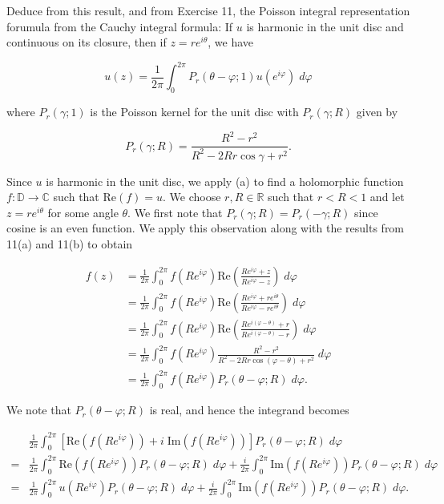 Deduce from this result, and from Exercise 11, the Poisson integral representation forumula from the Cauchy integral 
formula: If $u$ is harmonic in the unit disc and continuous on its closure, then if $z = re^{i \theta}$, we have

$$
u(z) = \frac{1}{2 \pi} \int_{0}^{2 \pi} P_r (\theta - \varphi; 1) u(e^{i \varphi}) \; d\varphi
$$

where $P_r(\gamma; 1)$ is the Poisson kernel for the unit disc with $P_r(\gamma; R)$ given by

$$
P_r(\gamma; R) = \frac{R^2 - r^2}{R^2 - 2 R r \cos \gamma + r^2}.
$$

\begin{solution}
    Since $u$ is harmonic in the unit disc, we apply (a) to find a holomorphic function $f:\mathbb{D} \to \mathbb{C}$
    such that $\text{Re}(f) = u$. We choose $r, R \in \mathbb{R}$ such that $r < R < 1$ and let $z = r e^{i \theta}$ for
    some angle $\theta$. We first note that $P_r(\gamma; R) = P_r(-\gamma; R)$ since cosine is an even function. We apply this
    observation along with the results from 11(a) and 11(b) to obtain

    \begin{align*}
    f(z) &= \frac{1}{2 \pi} \int_0^{2 \pi} f(R e^{i \varphi}) \text{Re} \left( \frac{R e^{i \varphi} + z}{R e^{i \varphi} - z} \right) \; d\varphi \\
         &= \frac{1}{2 \pi} \int_0^{2 \pi} f(R e^{i \varphi}) \text{Re} \left( \frac{R e^{i \varphi} + r e^{i \theta}}{R e^{i \varphi} - r e^{i \theta}} \right) \; d\varphi \\
         &= \frac{1}{2 \pi} \int_0^{2 \pi} f(R e^{i \varphi}) \text{Re} \left( \frac{R e^{i (\varphi - \theta)} + r}{R e^{i (\varphi - \theta)} - r} \right) \; d\varphi \\
         &= \frac{1}{2 \pi} \int_0^{2 \pi} f(R e^{i \varphi}) \frac{R^2 - r^2}{R^2 - 2 R r \cos(\varphi - \theta) + r^2} \; d\varphi \\
         &= \frac{1}{2 \pi} \int_0^{2 \pi} f(R e^{i \varphi}) P_r(\theta - \varphi; R) \; d\varphi.
    \end{align*}

    We note that $P_r(\theta - \varphi; R)$ is real, and hence the integrand becomes

    \begin{align*}
     &\frac{1}{2 \pi} \int_0^{2 \pi} \left[ \text{Re}\left(f(R e^{i \varphi})\right) + i \; \text{Im}\left(f(R e^{i \varphi})\right) \right] P_r(\theta - \varphi; R) \; d\varphi \\
    = &\frac{1}{2 \pi} \int_0^{2 \pi} \text{Re}\left(f(R e^{i \varphi})\right) P_r(\theta - \varphi; R) \; d\varphi + \frac{i}{2 \pi} \int_0^{2 \pi} \text{Im}\left(f(R e^{i \varphi})\right) P_r(\theta - \varphi; R) \; d\varphi \\
    = &\frac{1}{2 \pi} \int_0^{2 \pi} u(R e^{i \varphi}) P_r(\theta - \varphi; R) \; d\varphi + \frac{i}{2 \pi} \int_0^{2 \pi} \text{Im}\left(f(R e^{i \varphi})\right) P_r(\theta - \varphi; R) \; d\varphi.
    \end{align*}


\end{solution}
